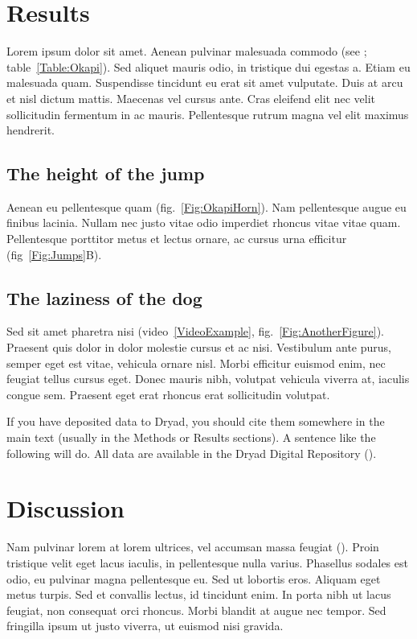 \documentclass[11pt]{article}
\begin{document}
\section*{Results}

Lorem ipsum dolor sit amet. Aenean pulvinar malesuada commodo (see \citealt{DavisEtAl2011}; table~\ref{Table:Okapi}). Sed aliquet mauris odio, in tristique dui egestas a. Etiam eu malesuada quam. Suspendisse tincidunt eu erat sit amet vulputate. Duis at arcu et nisl dictum mattis. Maecenas vel cursus ante. Cras eleifend elit nec velit sollicitudin fermentum in ac mauris. Pellentesque rutrum magna vel elit maximus hendrerit.

\subsection*{The height of the jump}

Aenean eu pellentesque quam (fig.~\ref{Fig:OkapiHorn}). Nam pellentesque augue eu finibus lacinia. Nullam nec justo vitae odio imperdiet rhoncus vitae vitae quam. Pellentesque porttitor metus et lectus ornare, ac cursus urna efficitur (fig~\ref{Fig:Jumps}B).

\subsection*{The laziness of the dog}

Sed sit amet pharetra nisi (video~\ref{VideoExample}, fig.~\ref{Fig:AnotherFigure}). Praesent quis dolor in dolor molestie cursus et ac nisi. Vestibulum ante purus, semper eget est vitae, vehicula ornare nisl. Morbi efficitur euismod enim, nec feugiat tellus cursus eget. Donec mauris nibh, volutpat vehicula viverra at, iaculis congue sem. Praesent eget erat rhoncus erat sollicitudin volutpat.

If you have deposited data to Dryad, you should cite them somewhere in the main text (usually in the Methods or Results sections). A sentence like the following will do. All data are available in the Dryad Digital Repository (\citealt{CookEtAl2015}).

\section*{Discussion}

Nam pulvinar lorem at lorem ultrices, vel accumsan massa feugiat (\citealt{Ing11}). Proin tristique velit eget lacus iaculis, in pellentesque nulla varius. Phasellus sodales est odio, eu pulvinar magna pellentesque eu. Sed ut lobortis eros. Aliquam eget metus turpis. Sed et convallis lectus, id tincidunt enim. In porta nibh ut lacus feugiat, non consequat orci rhoncus. Morbi blandit at augue nec tempor. Sed fringilla ipsum ut justo viverra, ut euismod nisi gravida.
\end{document}
